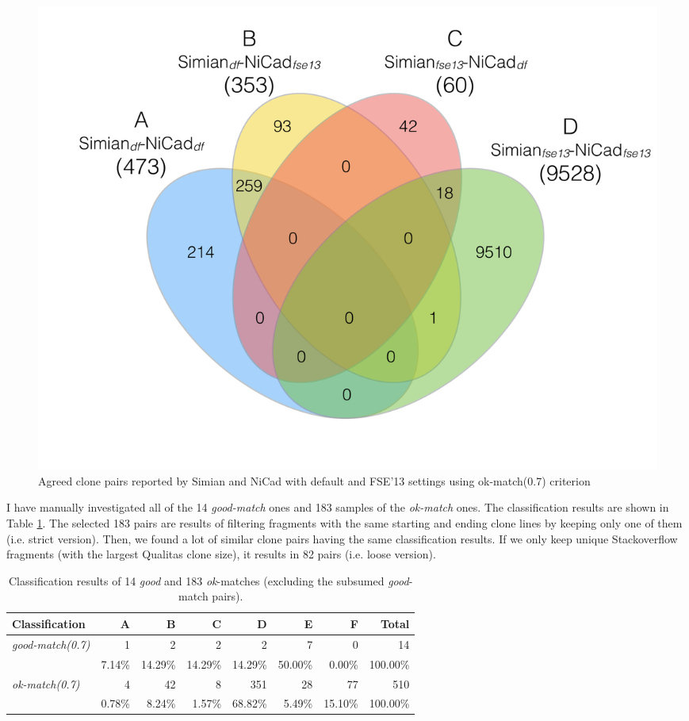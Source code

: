 \documentclass{IEEEtran}
\begin{document}
\begin{figure}[H]
	\centering
	\includegraphics[width=0.5\linewidth]{venn4_pairs_ok}
	\caption[Agreed clone pairs reported by Simian and NiCad with default and FSE'13 settings using ok-match(0.7) criterion]{Agreed clone pairs reported by Simian and NiCad with default and FSE'13 settings using ok-match(0.7) criterion}
	\label{fig:venn4_pairs}
\end{figure}

I have manually investigated all of the 14 \textit{good-match} ones and 183 samples of the \textit{ok-match} ones. The classification results are shown in Table \ref{tab:classification}. The selected 183 pairs are results of filtering fragments with the same starting and ending clone lines by keeping only one of them (i.e. strict version). Then, we found a lot of similar clone pairs having the same classification results. If we only keep unique Stackoverflow fragments (with the largest Qualitas clone size), it results in 82 pairs (i.e. loose version).

\begin{table}
	\centering
	\caption{Classification results of 14 \textit{good} and 183 \textit{ok}-matches (excluding the subsumed \textit{good}-match pairs).}
	\label{tab:classification}
		\begin{tabular}{|l|r|r|r|r|r|r|r|}
			\hline 
			Classification & A & B & C & D & E & F & Total \\ 
			\hline 
		    \multirow{2}{*}{\textit{good-match(0.7)}} & 1 & 2 & 2 & 2 & 7 & 0 & 14 \\ \cline{2-8}
			 & 7.14\%	& 14.29\%	& 14.29\%	& 14.29\%	& 50.00\%	& 0.00\%	& 100.00\% \\ 
			\hline
			\multirow{2}{*}{\textit{ok-match(0.7)}} & 4 & 42 & 8 & 351 & 28 & 77 & 510 \\ \cline{2-8}
			& 0.78\%	& 8.24\%	&	1.57\%	&	68.82\%	&	5.49\%	&	15.10\%	&	100.00\%  \\ 
			\hline
		\end{tabular} 
\end{table}
\end{document}
